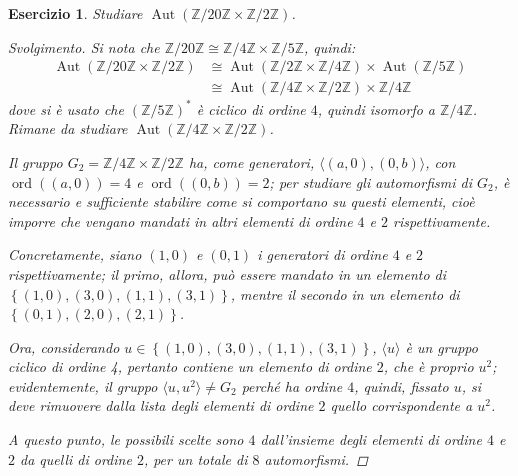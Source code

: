 \documentclass[12pt]{scrartcl}
\theoremstyle{style}
\newtheorem{esercizio}{Esercizio}[section]
\newenvironment{svolgimento}{\renewcommand\qedsymbol{$\blacksquare$}\begin{proof}[Svolgimento]}{\end{proof}}
\numberwithin{equation}{subsection}
\begin{document}
\begin{esercizio}
Studiare $\operatorname{Aut} (\mathbb{Z} / 20 \mathbb{Z} \times \mathbb{Z} / 2 \mathbb{Z})$.
\begin{svolgimento}
	Si nota che $\mathbb{Z} / 20 \mathbb{Z}\cong \mathbb{Z}/4 \mathbb{Z} \times  \mathbb{Z} / 5 \mathbb{Z}$, quindi:
	\[
		\begin{split}
			\operatorname{Aut} (\mathbb{Z}/20\mathbb{Z}\times \mathbb{Z}/2\mathbb{Z})&\cong \operatorname{Aut} (\mathbb{Z}/2\mathbb{Z} \times \mathbb{Z} / 4\mathbb{Z}) \times \operatorname{Aut} (\mathbb{Z}/5\mathbb{Z}) \\
												 &\cong\operatorname{Aut} (\mathbb{Z}/4\mathbb{Z}\times \mathbb{Z}/2\mathbb{Z}) \times \mathbb{Z}/4\mathbb{Z}
		\end{split}
	\] 
	dove si \`e usato che $(\mathbb{Z}/5\mathbb{Z})^*$ \`e ciclico di ordine $4$, quindi isomorfo a $\mathbb{Z}/4\mathbb{Z}$.
	Rimane da studiare $\operatorname{Aut} (\mathbb{Z}/4\mathbb{Z}\times \mathbb{Z}/2\mathbb{Z})$.

	Il gruppo $G_2 = \mathbb{Z}/4\mathbb{Z} \times  \mathbb{Z}/2\mathbb{Z}$ ha, come generatori, $\langle (a,0),(0,b) \rangle$, con $\operatorname{ord}((a,0)) = 4$ e $\operatorname{ord}((0,b)) =2$; per studiare gli automorfismi di $G_2$, \`e necessario e sufficiente stabilire come si comportano su questi elementi, cio\`e imporre che vengano mandati in altri elementi di ordine $4$ e $2 $ rispettivamente.

	Concretamente, siano $(1,0)$ e $(0,1)$ i generatori di ordine $4$ e $2 $ rispettivamente; il primo, allora, pu\`o essere mandato in un elemento di $\left\{ (1,0), (3,0),(1,1),(3,1) \right\} $, mentre il secondo in un elemento di $\left\{ (0,1), (2,0) , (2,1) \right\} $.

	Ora, considerando $u \in \left\{ (1,0), (3,0),(1,1),(3,1) \right\} $, $\langle u \rangle$ \`e un gruppo ciclico di ordine 4, pertanto contiene un elemento di ordine $2$, che \`e proprio $u^2$; evidentemente, il gruppo $\langle u,u^2 \rangle\neq G_2$ perch\'e ha ordine $4$, quindi, fissato $u$, si deve rimuovere dalla lista degli elementi di ordine $2$ quello corrispondente a $u^2$.

	A questo punto, le possibili scelte sono $4$ dall'insieme degli elementi di ordine $4$ e $2 $ da quelli di ordine $2$, per un totale di $8$ automorfismi.


\end{svolgimento}
\end{esercizio}
\end{document}
